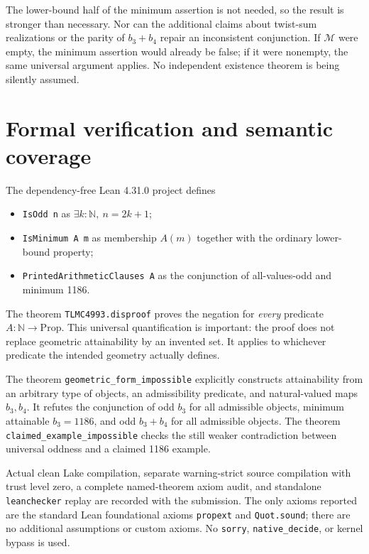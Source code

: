 \documentclass[11pt]{article}
\begin{document}
The lower-bound half of the minimum assertion is not needed, so the result is
stronger than necessary. Nor can the additional claims about twist-sum
realizations or the parity of $b_3+b_4$ repair an inconsistent conjunction.
If $\mathcal M$ were empty, the minimum assertion would already be false; if
it were nonempty, the same universal argument applies. No independent
existence theorem is being silently assumed.

\section{Formal verification and semantic coverage}
The dependency-free Lean 4.31.0 project defines
\begin{itemize}
\item \texttt{IsOdd n} as $\exists k:\mathbb N,\ n=2k+1$;
\item \texttt{IsMinimum A m} as membership $A(m)$ together with the ordinary
lower-bound property;
\item \texttt{PrintedArithmeticClauses A} as the conjunction of all-values-odd
and minimum 1186.
\end{itemize}
The theorem \texttt{TLMC4993.disproof} proves the negation for \emph{every}
predicate $A:\mathbb N\to\mathrm{Prop}$. This universal quantification is
important: the proof does not replace geometric attainability by an invented
set. It applies to whichever predicate the intended geometry actually defines.

The theorem \texttt{geometric\_form\_impossible} explicitly constructs
attainability from an arbitrary type of objects, an admissibility predicate,
and natural-valued maps $b_3,b_4$. It refutes the conjunction of odd $b_3$ for
all admissible objects, minimum attainable $b_3=1186$, and odd $b_3+b_4$ for all
admissible objects. The theorem \texttt{claimed\_example\_impossible} checks the
still weaker contradiction between universal oddness and a claimed 1186 example.

Actual clean Lake compilation, separate warning-strict source compilation with
trust level zero, a complete named-theorem axiom audit, and standalone
\texttt{leanchecker} replay are recorded with the submission. The only axioms
reported are the standard Lean foundational axioms \texttt{propext} and
\texttt{Quot.sound}; there are no additional assumptions or custom axioms.
No \texttt{sorry}, \texttt{native\_decide}, or kernel bypass is used.
\end{document}
